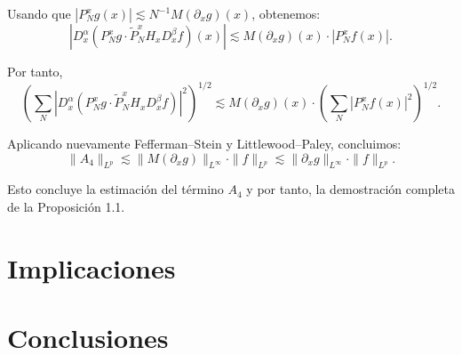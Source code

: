 \documentclass{aleph-revista}
\begin{document}
Usando que $|P_N^x g(x)| \lesssim N^{-1} M(\partial_x g)(x)$, obtenemos:
\[
|D_x^\alpha (P_N^x g \cdot \widetilde{P}_N^x H_x D_x^\beta f)(x)| \lesssim M(\partial_x g)(x) \cdot |P_N^x f(x)|.
\]

Por tanto,
\[
\left( \sum_{N} |D_x^\alpha (P_N^x g \cdot \widetilde{P}_N^x H_x D_x^\beta f)|^2 \right)^{1/2} \lesssim M(\partial_x g)(x) \cdot \left( \sum_N |P_N^x f(x)|^2 \right)^{1/2}.
\]

Aplicando nuevamente Fefferman--Stein y Littlewood--Paley, concluimos:
\[
\|A_4\|_{L^p} \lesssim \|M(\partial_x g)\|_{L^\infty} \cdot \|f\|_{L^p} \lesssim \|\partial_x g\|_{L^\infty} \cdot \|f\|_{L^p}.
\]

Esto concluye la estimaci\'on del t\'ermino $A_4$ y por tanto, la demostraci\'on completa de la Proposici\'on 1.1.
\section{Implicaciones}
\section{Conclusiones}
\newpage
\nocite{*}
\printbibliography
\end{document}
